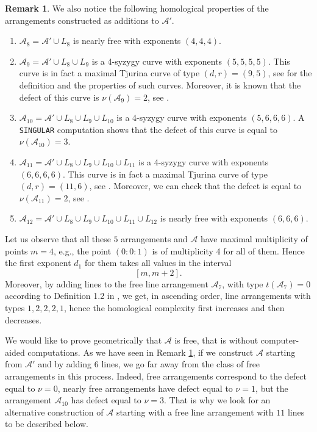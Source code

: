 \documentclass[12pt]{amsart}
\theoremstyle{plain}
\theoremstyle{definition}
\newtheorem{rk}[subsection]{Remark}
\numberwithin{equation}{section}
\newcommand{\A}{{\mathcal A}}
\begin{document}
\begin{rk}
\label{rkA13}
We also notice the following homological properties of the arrangements constructed as additions to $\A'$.
\begin{enumerate}
\item $\A_{8}= \A' \cup L_8$ is nearly free with exponents $(4,4,4)$.
\item $\A_{9}=\A' \cup L_8 \cup L_9$ is a 4-syzygy curve with exponents $(5,5,5,5)$. This curve is in fact a maximal Tjurina curve of type $(d,r)=(9,5)$, see \cite{maxT} for the definition and the properties of such curves. 
Moreover, it is known that the defect of this curve is $\nu(\A_9)=2$, see \cite[Theorem 3.11]{3syz}.
 
\item $\A_{10}=\A' \cup L_8 \cup L_9 \cup L_{10}$ is a 4-syzygy curve with exponents $(5,6,6,6)$. A \verb}SINGULAR} computation shows that the defect of this curve is equal to $\nu(\A_{10})=3$. 
 
\item $\A_{11}=\A' \cup L_8 \cup L_9 \cup L_{10} \cup L_{11}$ is a 4-syzygy curve with exponents $(6,6,6,6)$. This curve is in fact a maximal Tjurina curve of type $(d,r)=(11,6)$, see \cite{maxT}. Moreover, we can check that the defect is equal to $\nu(\A_{11})=2$, see \cite[Theorem 3.11]{3syz}.
 
\item $\A_{12}=\A' \cup L_8 \cup L_9 \cup L_{10} \cup L_{11} \cup L_{12}$ is nearly free with exponents $(6,6,6)$. 
\end{enumerate} 
Let us observe that all these $5$ arrangements and $\A$ have maximal multiplicity of points
 $m=4$, e.g., the point $(0:0:1)$ is of multiplicity 4 for all of them.
 Hence the first exponent $d_1$ for them takes all values in the interval
 $$[m,m+2].$$
 Moreover, by adding lines to the free line arrangement $\A_7$, with type $t(\A_7)=0$ according to Definition 1.2 in \cite{ADP}, we get, in ascending order, line arrangements with types $1,2,2,2,1$, hence the homological complexity first increases and then decreases.
 \end{rk}
 We would like to prove geometrically that $\A$ is free, that is without computer-aided computations. As we have seen in Remark \ref{rkA13},
if we construct $\A$ starting from $\A'$ and by adding $6$ lines, we go far away from the class of free arrangements in this process. Indeed, free arrangements correspond to the defect equal to $\nu=0$, nearly free arrangements have defect equal to $\nu=1$, but the arrangement $\A_{10}$ has defect equal to $\nu=3$. That is why we look for an alternative construction of $\A$ starting with a free line arrangement with $11$ lines to be described below.
\end{document}
